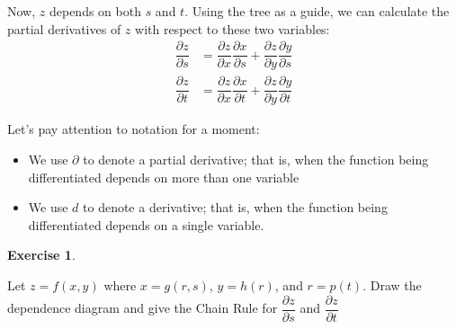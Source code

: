 \documentclass[
]{book}
\providecommand{\tightlist}{%
  \setlength{\itemsep}{0pt}\setlength{\parskip}{0pt}}
\theoremstyle{definition}
\theoremstyle{definition}
\theoremstyle{definition}
\newtheorem{exercise}{Exercise}[chapter]
\theoremstyle{definition}
\theoremstyle{remark}
\begin{document}
Now, \(z\) depends on both \(s\) and \(t\). Using the tree as a guide, we can calculate the partial derivatives of \(z\) with respect to these two variables:
\begin{align*}
\dfrac{\partial z}{\partial s}& = \dfrac{\partial z}{\partial x}\dfrac{\partial x}{\partial s} +\dfrac{\partial z}{\partial y}\dfrac{\partial y}{\partial s}  \\
\dfrac{\partial z}{\partial t} &=\dfrac{\partial z}{\partial x}\dfrac{\partial x}{\partial t} +\dfrac{\partial z}{\partial y}\dfrac{\partial y}{\partial t}
\end{align*}

Let's pay attention to notation for a moment:

\begin{itemize}
\tightlist
\item
  We use \(\partial\) to denote a partial derivative; that is, when the function being differentiated depends on more than one variable
\item
  We use \(d\) to denote a derivative; that is, when the function being differentiated depends on a single variable.
\end{itemize}

\begin{exercise}
\protect\hypertarget{exr:unlabeled-div-44}{}\label{exr:unlabeled-div-44}

Let \(z=f(x,y)\) where \(x=g(r,s)\), \(y= h(r)\), and \(r=p(t)\). Draw the dependence diagram and give the Chain Rule for \(\dfrac{\partial z}{\partial s}\) and \(\dfrac{\partial z}{\partial t}\)

\end{exercise}
\end{document}

